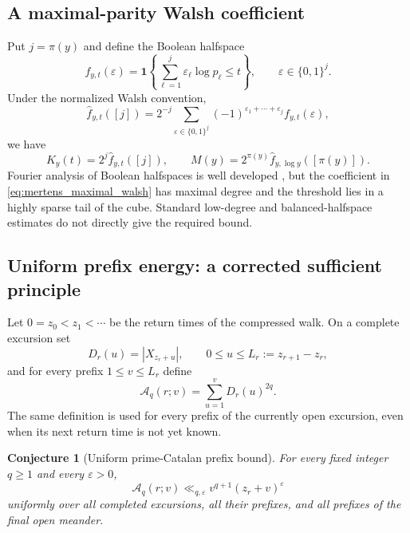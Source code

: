 \documentclass[11pt]{amsart}
\numberwithin{equation}{section}
\theoremstyle{plain}
\newtheorem{conjecture}[theorem]{Conjecture}
\theoremstyle{definition}
\theoremstyle{remark}
\newcommand{\Mert}{M}
\newcommand{\eps}{\varepsilon}
\begin{document}
\subsection{A maximal-parity Walsh coefficient}

Put $j=\pi(y)$ and define the Boolean halfspace
\begin{equation}
f_{y,t}(\varepsilon)=
\mathbf 1\!\left\{
\sum_{\ell=1}^j\varepsilon_\ell\log p_\ell\leq t
\right\},
\qquad \varepsilon\in\{0,1\}^j.
\end{equation}
Under the normalized Walsh convention,
\begin{equation}
\widehat f_{y,t}([j])
=2^{-j}\sum_{\varepsilon\in\{0,1\}^j}
(-1)^{\varepsilon_1+\cdots+\varepsilon_j}f_{y,t}(\varepsilon),
\end{equation}
we have
\begin{equation}
K_y(t)=2^j\widehat f_{y,t}([j]),
\qquad
\Mert(y)=2^{\pi(y)}\widehat f_{y,\log y}([\pi(y)]).
\label{eq:mertens_maximal_walsh}
\end{equation}
Fourier analysis of Boolean halfspaces is well developed
\cite{MatulefEtAl2010}, but the coefficient in
\eqref{eq:mertens_maximal_walsh} has maximal degree and the threshold lies in
a highly sparse tail of the cube.  Standard low-degree and balanced-halfspace
estimates do not directly give the required bound.

\subsection{Uniform prefix energy: a corrected sufficient principle}

Let $0=z_0<z_1<\cdots$ be the return times of the compressed walk.  On a
complete excursion set
\begin{equation}
D_r(u)=|X_{z_r+u}|,
\qquad 0\leq u\leq L_r:=z_{r+1}-z_r,
\end{equation}
and for every prefix $1\leq v\leq L_r$ define
\begin{equation}
\mathcal A_q(r;v)=\sum_{u=1}^{v}D_r(u)^{2q}.
\label{eq:prefix_catalan_energy}
\end{equation}
The same definition is used for every prefix of the currently open excursion,
even when its next return time is not yet known.

\begin{conjecture}[Uniform prime-Catalan prefix bound]
\label{conj:uniform_prime_catalan_prefix}
For every fixed integer $q\geq1$ and every $\eps>0$,
\begin{equation}
\mathcal A_q(r;v)
\ll_{q,\eps}v^{q+1}(z_r+v)^\eps
\label{eq:uniform_prefix_bound}
\end{equation}
uniformly over all completed excursions, all their prefixes, and all prefixes
of the final open meander.
\end{conjecture}
\end{document}
